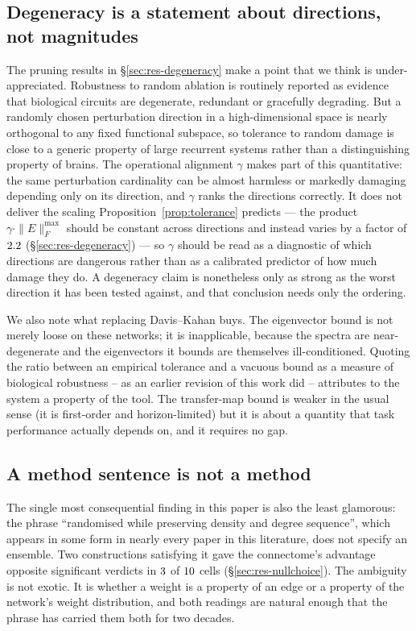\subsection{Degeneracy is a statement about directions, not magnitudes}

The pruning results in \S\ref{sec:res-degeneracy} make a point that we think is
under-appreciated. Robustness to random ablation is routinely reported as evidence that
biological circuits are degenerate, redundant or gracefully degrading. But a randomly
chosen perturbation direction in a high-dimensional space is nearly orthogonal to any
fixed functional subspace, so tolerance to random damage is close to a generic property
of large recurrent systems rather than a distinguishing property of brains. The
operational alignment $\gamma$ makes part of this quantitative: the same perturbation
cardinality can be almost harmless or markedly damaging depending only on its direction,
and $\gamma$ ranks the directions correctly. It does not deliver the scaling
Proposition~\ref{prop:tolerance} predicts --- the product $\gamma\cdot\|E\|_F^{\max}$
should be constant across directions and instead varies by a factor of
$2.2$ (\S\ref{sec:res-degeneracy}) --- so $\gamma$ should be read as a
diagnostic of which directions are dangerous rather than as a calibrated predictor of how
much damage they do. A degeneracy claim is nonetheless only as strong as the worst
direction it has been tested against, and that conclusion needs only the ordering.

We also note what replacing Davis--Kahan buys. The eigenvector bound is not merely loose
on these networks; it is inapplicable, because the spectra are near-degenerate and the
eigenvectors it bounds are themselves ill-conditioned. Quoting the ratio between an
empirical tolerance and a vacuous bound as a measure of biological robustness -- as an
earlier revision of this work did -- attributes to the system a property of the tool.
The transfer-map bound is weaker in the usual sense (it is first-order and
horizon-limited) but it is about a quantity that task performance actually depends on,
and it requires no gap.

\subsection{A method sentence is not a method}
\label{sec:disc-null}

The single most consequential finding in this paper is also the least glamorous: the
phrase ``randomised while preserving density and degree sequence'', which appears in some
form in nearly every paper in this literature, does not specify an ensemble. Two
constructions satisfying it gave the connectome's advantage opposite significant verdicts
in $3$ of $10$ cells (\S\ref{sec:res-nullchoice}). The ambiguity
is not exotic. It is whether a weight is a property of an edge or a property of the
network's weight distribution, and both readings are natural enough that the phrase has
carried them both for two decades.

